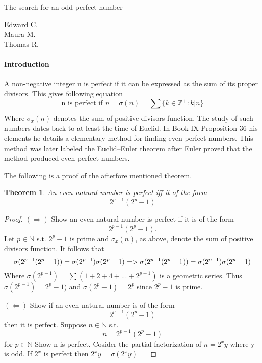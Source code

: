 \documentclass[12pt]{article}
\newtheorem{theorem}{Theorem}
\begin{document}
\begin{center}
	\Large
	The search for an odd perfect number
\end{center}

\begin{flushright}
	Edward C.\\
	\vspace{2 mm}
	Maura M.\\
	\vspace{2 mm}
	Thomas R.\\
\end{flushright}

\paragraph*{Introduction}
	A non-negative integer n is perfect if it can be expressed as the sum of its proper divisors. This gives following equation 
	$$\text{n is perfect if } n = \sigma(n) = \sum_{}{}\{k \in \mathbb{Z}^+ : k|n\}$$  Where $\sigma_x (n)$ 
	denotes the sum of positive divisors function.  The study of such numbers dates back to at least the 
	time of Euclid. In Book IX Proposition 36 his elements he details a elementary method for finding even
	perfect numbers.  This method was later labeled the Euclid–Euler theorem
	after Euler proved that the method produced even perfect numbers.
	
	The following is a proof of the afterfore mentioned theorem.
	
	\begin{theorem}
		An even natural number is perfect iff it of the form $$2^{p-1} (2^{p} - 1)$$
	\end{theorem}
	
	\begin{proof}
		$(\Rightarrow)$
			Show an even natural number is perfect if it is of the form  $$2^{p-1} (2^{p} - 1).$$
			Let $p \in \mathbb{N}$ s.t. $2^{p}-1$ is prime and $\sigma_x (n)$, as above, denote the sum of positive divisors function.
			It follows that $$\sigma (2^{p-1}(2^{p}-1))=\sigma (2^{p-1})\sigma (2^{p}-1) \newline =>
			\sigma (2^{p-1}(2^{p}-1))=\sigma (2^{p-1})\sigma (2^{p}-1)$$
			Where $\sigma (2^{p-1}) = \sum{}{}(1 + 2 + 4 + ... + 2^{p-1})$ is a geometric series.\newline
			Thus $\sigma (2^{p-1}) = 2^{p}-1)$ and $\sigma (2^{p}-1) = 2^{p}$ since $2^{p}-1$ is prime.
		
		$(\Leftarrow)$
			Show if an even natural number is of the form  $$2^{p-1} (2^{p} - 1)$$ then it is perfect.
			Suppose $n \in \mathbb{N}$ s.t. $$n = 2^{p-1} (2^{p} - 1)$$ for $p \in \mathbb{N}$
			Show n is perfect.
			Cosider the partial factorization of $n = 2^{x}y$ where y is odd.
			If $2^{x}$ is perfect then $2^{x}y = \sigma (2^{x}y) = $
 
	\end{proof}
\end{document}
